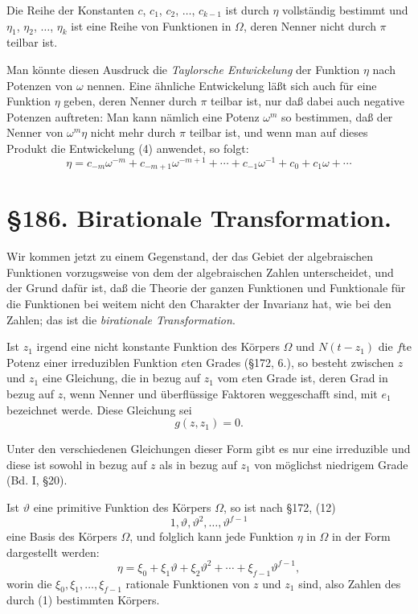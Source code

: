 \documentclass[12pt,a4paper]{article}
\theoremstyle{definition}
\begin{document}
Die Reihe der Konstanten $c$, $c_1$, $c_2$, $\ldots$, $c_{k-1}$ ist durch $\eta$ vollständig bestimmt und $\eta_1$, $\eta_2$, $\ldots$, $\eta_k$ ist eine Reihe von Funktionen in $\Omega$, deren Nenner nicht durch $\pi$ teilbar ist.

Man könnte diesen Ausdruck die \emph{Taylorsche Entwickelung} der Funktion $\eta$ nach Potenzen von $\omega$ nennen. Eine ähnliche Entwickelung läßt sich auch für eine Funktion $\eta$ geben, deren Nenner durch $\pi$ teilbar ist, nur daß dabei auch negative Potenzen auftreten: Man kann nämlich eine Potenz $\omega^m$ so bestimmen, daß der Nenner von $\omega^m\eta$ nicht mehr durch $\pi$ teilbar ist, und wenn man auf dieses Produkt die Entwickelung (4) anwendet, so folgt:
\begin{equation}
\eta = c_{-m}\omega^{-m} + c_{-m+1}\omega^{-m+1} + \cdots + c_{-1}\omega^{-1} + c_0 + c_1\omega + \cdots
\end{equation}

\newpage
\section*{\S 186. Birationale Transformation.}

Wir kommen jetzt zu einem Gegenstand, der das Gebiet der algebraischen Funktionen vorzugsweise von dem der algebraischen Zahlen unterscheidet, und der Grund dafür ist, daß die Theorie der ganzen Funktionen und Funktionale für die Funktionen bei weitem nicht den Charakter der Invarianz hat, wie bei den Zahlen; das ist die \emph{birationale Transformation}.

Ist $z_1$ irgend eine nicht konstante Funktion des Körpers $\Omega$ und $N(t - z_1)$ die $f$te Potenz einer irreduziblen Funktion $e$ten Grades (\S 172, 6.), so besteht zwischen $z$ und $z_1$ eine Gleichung, die in bezug auf $z_1$ vom $e$ten Grade ist, deren Grad in bezug auf $z$, wenn Nenner und überflüssige Faktoren weggeschafft sind, mit $e_1$ bezeichnet werde. Diese Gleichung sei
\begin{equation}
g(z, z_1) = 0.
\end{equation}

Unter den verschiedenen Gleichungen dieser Form gibt es nur eine irreduzible und diese ist sowohl in bezug auf $z$ als in bezug auf $z_1$ von möglichst niedrigem Grade (Bd. I, \S 20).

Ist $\vartheta$ eine primitive Funktion des Körpers $\Omega$, so ist nach \S 172, (12)
\begin{equation}
1, \vartheta, \vartheta^2, \ldots, \vartheta^{f-1}
\end{equation}
eine Basis des Körpers $\Omega$, und folglich kann jede Funktion $\eta$ in $\Omega$ in der Form dargestellt werden:
\begin{equation}
\eta = \xi_0 + \xi_1\vartheta + \xi_2\vartheta^2 + \cdots + \xi_{f-1}\vartheta^{f-1},
\end{equation}
worin die $\xi_0, \xi_1, \ldots, \xi_{f-1}$ rationale Funktionen von $z$ und $z_1$ sind, also Zahlen des durch (1) bestimmten Körpers.
\end{document}
